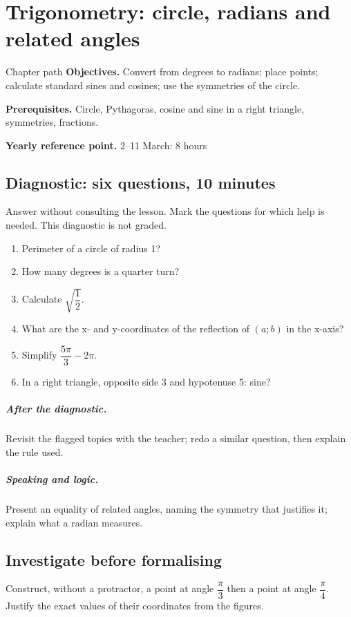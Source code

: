 \chapter{Trigonometry: circle, radians and related angles}\label{C10}
\begin{repere}{Chapter path}
\textbf{Objectives.} Convert from degrees to radians; place points; calculate standard sines and cosines; use the symmetries of the circle.

\textbf{Prerequisites.} Circle, Pythagoras, cosine and sine in a right triangle, symmetries, fractions.

\textbf{Yearly reference point.} 2--11 March: 8 hours\end{repere}
\section*{Diagnostic: six questions, 10 minutes}\label{C10-D}
Answer without consulting the lesson. Mark the questions for which help is needed. This diagnostic is not graded.
\begin{enumerate}
\item Perimeter of a circle of radius 1?
\item How many degrees is a quarter turn?
\item Calculate $\sqrt {\dfrac{1}{2}}$.
\item What are the x- and y-coordinates of the reflection of $(a;b)$ in the x-axis?
\item Simplify $\dfrac{5\pi}{3}-2\pi $.
\item In a right triangle, opposite side 3 and hypotenuse 5: sine?
\end{enumerate}
\paragraph{After the diagnostic.} Revisit the flagged topics with the teacher; redo a similar question, then explain the rule used.
\paragraph{Speaking and logic.} Present an equality of related angles, naming the symmetry that justifies it; explain what a radian measures.
\clearpage
\section*{Investigate before formalising}\label{C10-RECH}
Construct, without a protractor, a point at angle $\dfrac{\pi}{3}$ then a point at angle $\dfrac{\pi}{4}$. Justify the exact values of their coordinates from the figures.
